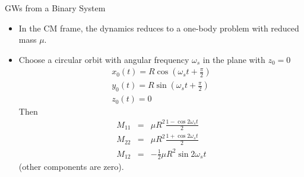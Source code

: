 \documentclass[size=11pt,style=paintings]{powerdot}
\begin{document}
\begin{slide}{GWs from a Binary System}
 \begin{itemize}
 \item In the CM frame, the dynamics reduces to a one-body problem with reduced mass $\mu$.

\vspace{0.3cm} \item Choose a circular orbit with angular frequency $\omega_s$ in the plane with $z_0=0$$$
\begin{array}{l}{x_{0}(t)=R \cos \left(\omega_{s} t+\frac{\pi}{2}\right)} \\ {y_{0}(t)=R \sin \left(\omega_{s} t+\frac{\pi}{2}\right)} \\ {z_{0}(t)=0}\end{array}
$$Then
\begin{eqnarray}
M_{11} &=& \mu R^{2} \frac{1-\cos 2 \omega_{s} t}{2} \\ M_{22} &=& \mu R^{2} \frac{1+\cos 2 \omega_{s} t}{2} \\ M_{12} &=& -\frac{1}{2} \mu R^{2} \sin 2 \omega_{s} t 
\end{eqnarray}
(other components are zero).
 \end{itemize}
 \end{slide}
\end{document}
